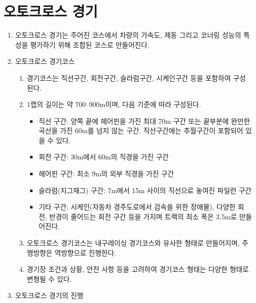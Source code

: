 \documentclass[final,a4paper,10pt]{report}
\begin{document}

\section{오토크로스 경기}\label{rule:formula-competition.autocross}
\begin{enumerate}
  \item\label{rule:formula-competition.autocross.combined-accel-brake-cornering} 오토크로스 경기는 주어진 코스에서 차량의 가속도, 제동 그리고 코너링 성능의 특성을 평가하기 위해 조합된 코스로 만들어진다.
  \item\label{rule:formula-competition.autocross.course} 오토크로스 경기코스
    \begin{enumerate}
      \item\label{rule:formula-competition.autocross.course.straights-turns-slalom-chicane} 경기코스는 직선구간, 회전구간, 슬라럼구간, 시케인구간 등을 포함하여 구성된다.
      \item\label{rule:formula-competition.autocross.course.lap-length-and-geometry} 1랩의 길이는 약 700--900m이며, 다음 기준에 따라 구성된다.
        \begin{itemize}
          \item 직선 구간: 양쪽 끝에 헤어핀을 가진 최대 70m 구간 또는 끝부분에 완만한 곡선을 가진 60m를 넘지 않는 구간. 직선구간에는 추월구간이 포함되어 있을 수 있다.
          \item 회전 구간: 30m에서 60m의 직경을 가진 구간
          \item 헤어핀 구간: 최소 9m의 외부 직경을 가진 구간
          \item 슬라럼(지그재그) 구간: 7m에서 15m 사이의 직선으로 놓여진 파일런 구간
          \item 기타 구간: 시케인(자동차 경주도로에서 감속을 위한 장애물), 다양한 회전, 반경이 줄어드는 회전 구간 등을 가지며 트랙의 최소 폭은 3.5m로 만들어진다.
        \end{itemize}
      \item\label{rule:formula-competition.autocross.course.reverse-of-endurance-layout} 오토크로스 경기코스는 내구레이싱 경기코스와 유사한 형태로 만들어지며, 주행방향은 역방향으로 진행한다.
      \item\label{rule:formula-competition.autocross.course.layout-may-vary} 경기장 조건과 상황, 안전 사항 등을 고려하여 경기코스 형태는 다양한 형태로 변형될 수 있다.
    \end{enumerate}
  \item\label{rule:formula-competition.autocross.run-procedure} 오토크로스 경기의 진행

\end{enumerate}
\end{document}
